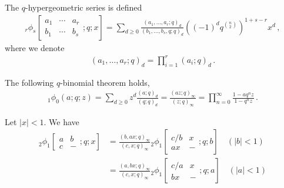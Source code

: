 \begin{definition}\label{def:q-hypergeometric_fn}
    The $q$-hypergeometric series is defined
    \begin{align}
        _r \phi_s
        \left[
        \begin{matrix}
            a_1 & \cdots & a_r \\ b_1 & \cdots & b_s
        \end{matrix}; q ; x
        \right]
        = \sum_{d \ge 0} \frac{(a_1,\ldots,a_r;q)_d}{(b_1,\ldots,b_s,q;q)_d} \left((-1)^d q^{{n \choose 2}}\right)^{1 + s - r} x^d 
        \, ,
    \end{align}
    where we denote
    \begin{align}
        (a_1,\ldots,a_r;q)_d = \prod_{i=1}^r (a_i;q)_d \, .
    \end{align}
\end{definition}
\begin{proposition}
    The following $q$-binomial theorem holds,
    \begin{align}
    _{1}\phi_0 (a;q;z) = \sum_{d \ge 0} z^d \frac{(a;q)_d}{(q;q)_d} = \frac{(az;q)_\infty}{(z;q)_\infty}= \prod_{n=0}^\infty \frac{1-aq^n z}{1-q^n z} \, .
    \end{align}
\end{proposition}
\fi
\begin{proposition}\label{prop:Heine_transform}
    Let $|x| < 1$.
    We have
    \begin{subequations}
    \begin{align}
    {_2\phi_1} \left[
    \begin{matrix}
        a & b \\ c & -
    \end{matrix}; q; x
    \right] 
    & = 
    \frac{(b,ax;q)_\infty}{(c,x;q)_\infty}
    {_2\phi_1} \left[
    \begin{matrix}
        c/b & x \\ a x & -
    \end{matrix}; q; b
    \right]
    \quad (|b| < 1) \\
    & = 
    \frac{(a,bx;q)_\infty}{(c,x;q)_\infty}
    {_2\phi_1} \left[
    \begin{matrix}
        c/a & x \\ b x & -
    \end{matrix}; q; a
    \right]
    \quad (|a| < 1) 
    \end{align}
    \end{subequations}
\end{proposition}
